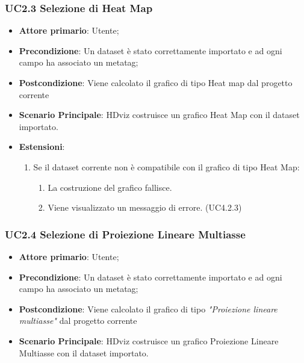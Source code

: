 \subsubsection{UC2.3 Selezione di Heat Map}
\label{ssub:UC2.3}
\begin{itemize}

    \item \textbf{Attore primario}: Utente;

	\item \textbf{Precondizione}:   Un dataset è stato correttamente importato e ad ogni campo 
									ha associato un metatag;

    \item \textbf{Postcondizione}:  Viene calcolato il grafico di tipo Heat map dal progetto corrente
	\item \textbf{Scenario Principale}: HDviz costruisce un grafico Heat Map con il dataset importato.
	\item \textbf{Estensioni}:
	\begin{enumerate}
		\item Se il dataset corrente non è compatibile con il grafico di tipo Heat Map:
		\begin{enumerate}
			\item La costruzione del grafico fallisce.
			\item Viene visualizzato un messaggio di errore. (UC4.2.3)
		\end{enumerate}
	\end{enumerate}
\end{itemize}


\subsubsection{UC2.4 Selezione di Proiezione Lineare Multiasse}
\label{ssub:UC2.4}
\begin{itemize}

    \item \textbf{Attore primario}: Utente;

    \item \textbf{Precondizione}:   Un dataset è stato correttamente importato e ad ogni campo ha associato
                                    un metatag;

    \item \textbf{Postcondizione}:  Viene calcolato il grafico di tipo \emph{"Proiezione lineare multiasse"} dal progetto corrente

	\item \textbf{Scenario Principale}: HDviz costruisce un grafico Proiezione Lineare Multiasse con il dataset importato.
\end{itemize}

